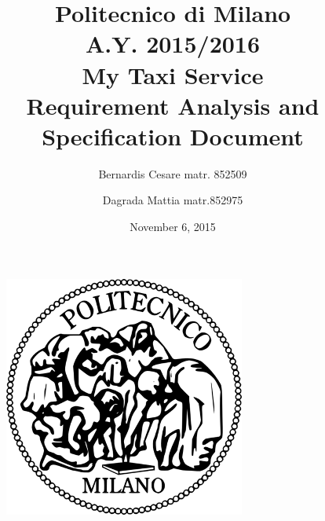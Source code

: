 \documentclass[11pt,a4paper,titlepage]{article}
\begin{document}
\begin{figure}
	\centering
	\includegraphics[scale=0.6]{../SE2_IMAGES/Logo_Politecnico_Milano}
\end{figure}
\title{Politecnico di Milano\\A.Y. 2015/2016\\\textbf{My Taxi Service}\\Requirement Analysis and Specification Document\\}
\author{Bernardis Cesare matr. 852509 \and Dagrada Mattia matr.852975}
\date{November 6, 2015}
\maketitle

\newpage

\tableofcontents

\newpage



\end{document}
